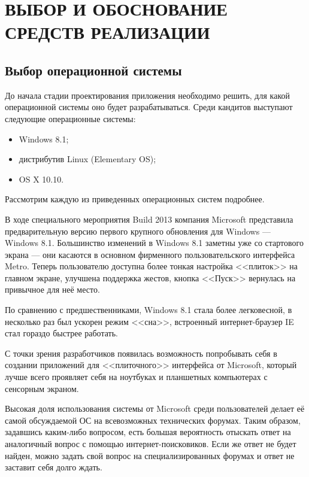 \section[Выбор и обоснование средств реализации]{ВЫБОР И ОБОСНОВАНИЕ \\ СРЕДСТВ РЕАЛИЗАЦИИ}
\label{sec:choice}

\subsection{Выбор операционной системы}

До начала стадии проектирования приложения необходимо решить,
для какой операционной системы оно будет разрабатываться.
Среди кандитов выступают следующие операционные системы:
\begin{itemize}
  \item Windows 8.1;
  \item дистрибутив Linux (Elementary OS);
  \item OS X 10.10.
\end{itemize}

Рассмотрим каждую из приведенных операционных систем подробнее.

В ходе специального мероприятия Build 2013 компания Microsoft представила
предварительную версию первого крупного обновления для Windows --- Windows 8.1.
Большинство изменений в Windows 8.1 заметны уже со стартового экрана --- они
касаются в основном фирменного пользовательского интерфейса Metro. Теперь
пользователю доступна более тонкая настройка <<плиток>> на главном экране,
улучшена поддержка жестов, кнопка <<Пуск>> вернулась на привычное для неё место.

По сравнению с предшественниками, Windows 8.1 стала более легковесной,
в несколько раз был ускорен режим <<сна>>, встроенный интернет-браузер IE
стал гораздо быстрее работать.

С точки зрения разработчиков появилась возможность попробывать себя в создании
приложений для <<плиточного>> интерфейса от Microsoft, который лучше всего
проявляет себя на ноутбуках и планшетных компьютерах с сенсорным экраном.

Высокая доля использования системы от Microsoft среди пользователей делает её
самой обсуждаемой ОС на всевозможных технических форумах. Таким образом,
задавшись каким-либо вопросом, есть большая вероятность отыскать ответ на
аналогичный вопрос с помощью интернет-поисковиков. Если же ответ не будет
найден, можно задать свой вопрос на специализированных форумах и ответ не
заставит себя долго ждать.

